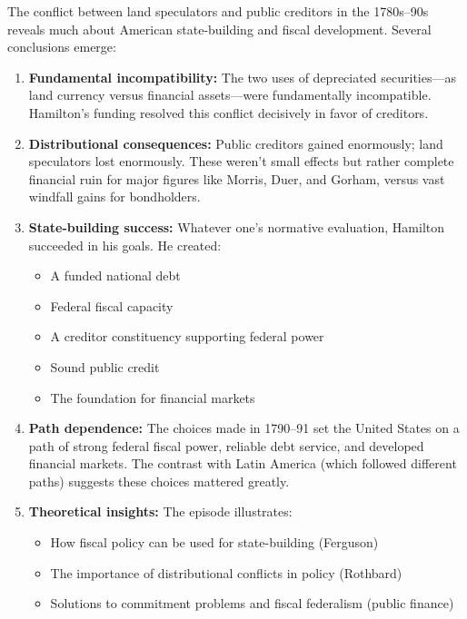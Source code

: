\documentclass[12pt]{article}
\begin{document}
The conflict between land speculators and public creditors in the 1780s--90s reveals much about American state-building and fiscal development. Several conclusions emerge:

\begin{enumerate}
\item \textbf{Fundamental incompatibility:} The two uses of depreciated securities---as land currency versus financial assets---were fundamentally incompatible. Hamilton's funding resolved this conflict decisively in favor of creditors.

\item \textbf{Distributional consequences:} Public creditors gained enormously; land speculators lost enormously. These weren't small effects but rather complete financial ruin for major figures like Morris, Duer, and Gorham, versus vast windfall gains for bondholders.

\item \textbf{State-building success:} Whatever one's normative evaluation, Hamilton succeeded in his goals. He created:
\begin{itemize}
\item A funded national debt
\item Federal fiscal capacity
\item A creditor constituency supporting federal power
\item Sound public credit
\item The foundation for financial markets
\end{itemize}

\item \textbf{Path dependence:} The choices made in 1790--91 set the United States on a path of strong federal fiscal power, reliable debt service, and developed financial markets. The contrast with Latin America (which followed different paths) suggests these choices mattered greatly.

\item \textbf{Theoretical insights:} The episode illustrates:
\begin{itemize}
\item How fiscal policy can be used for state-building (Ferguson)
\item The importance of distributional conflicts in policy (Rothbard)
\item Solutions to commitment problems and fiscal federalism (public finance)
\end{itemize}


\end{enumerate}
\end{document}
